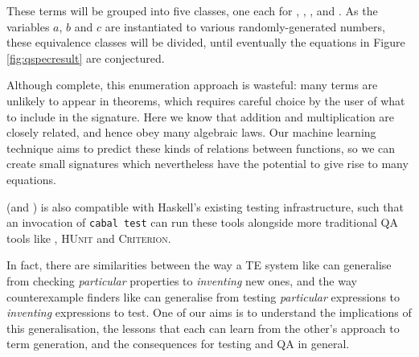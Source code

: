 These terms will be grouped into five classes, one each for ,
, ,  and . As the
variables $a$, $b$ and $c$ are instantiated to various randomly-generated
numbers, these equivalence classes will be divided, until eventually the
equations in Figure \ref{fig:qspecresult} are conjectured.

Although complete, this enumeration approach is wasteful: many terms are
unlikely to appear in theorems, which requires careful choice by the user of
what to include in the signature. Here we know that addition and multiplication
are closely related, and hence obey many algebraic laws. Our machine learning
technique aims to predict these kinds of relations between functions, so we can
create small signatures which nevertheless have the potential to give rise to
many equations.

\qspec{} (and \hspec{}) is also compatible with Haskell's existing testing
infrastructure, such that an invocation of \texttt{cabal test} can run these
tools alongside more traditional QA tools like \qcheck{}, \textsc{HUnit} and
\textsc{Criterion}.

In fact, there are similarities between the way a TE system like \qspec{} can
generalise from checking \emph{particular} properties to \emph{inventing} new
ones, and the way counterexample finders like \qcheck{} can generalise from
testing \emph{particular} expressions to \emph{inventing} expressions to
test. One of our aims is to understand the implications of this generalisation,
the lessons that each can learn from the other's approach to term generation,
and the consequences for testing and QA in general.
